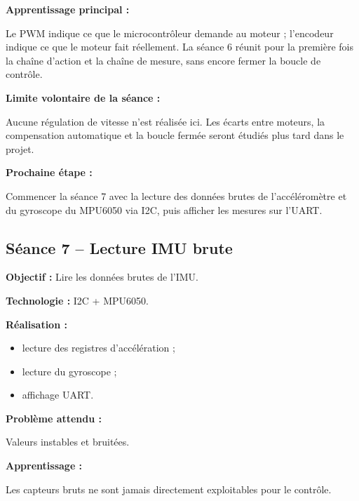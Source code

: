 \documentclass[11pt,a4paper]{article}
\begin{document}
\begin{sessionbox}
		\vspace{0.3cm}
		
		\textbf{Apprentissage principal :}
		
		Le PWM indique ce que le microcontrôleur demande au moteur ; l'encodeur indique ce que le moteur fait réellement. La séance 6 réunit pour la première fois la chaîne d'action et la chaîne de mesure, sans encore fermer la boucle de contrôle.
		
		\vspace{0.3cm}
		
		\textbf{Limite volontaire de la séance :}
		
		Aucune régulation de vitesse n'est réalisée ici. Les écarts entre moteurs, la compensation automatique et la boucle fermée seront étudiés plus tard dans le projet.
		
		\vspace{0.3cm}
		
		\textbf{Prochaine étape :}
		
		Commencer la séance 7 avec la lecture des données brutes de l'accéléromètre et du gyroscope du MPU6050 via I2C, puis afficher les mesures sur l'UART.
		
	\end{sessionbox}
	
	
	\subsection*{Séance 7 -- Lecture IMU brute}
	
	\begin{sessionbox}
		
		\textbf{Objectif :} Lire les données brutes de l'IMU.
		
		\vspace{0.3cm}
		
		\textbf{Technologie :} I2C + MPU6050.
		
		\vspace{0.3cm}
		
		\textbf{Réalisation :}
		
		\begin{itemize}
			\item lecture des registres d'accélération ;
			\item lecture du gyroscope ;
			\item affichage UART.
		\end{itemize}
		
		\vspace{0.3cm}
		
		\textbf{Problème attendu :}
		
		Valeurs instables et bruitées.
		
		\vspace{0.3cm}
		
		\textbf{Apprentissage :}
		
		Les capteurs bruts ne sont jamais directement exploitables pour le contrôle.
		
	\end{sessionbox}
	
\end{document}
